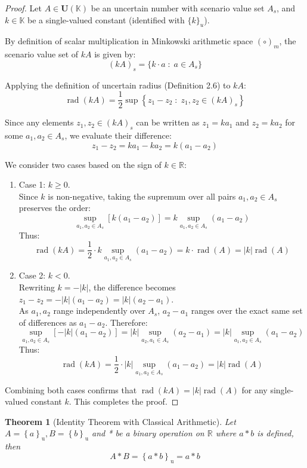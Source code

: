 \documentclass[a4paper,12pt, twoside]{memoir}
\newtheorem{theorem}{Theorem}[chapter]
\DeclareMathOperator{\rad}{rad}
\newcommand{\set}[1]{\left\{#1\right\}} %
\newcommand{\s}[1]{\set{#1}_\mathrm{u}} %
\newcommand{\tsbd}[1]{\mathbf{U}(\mathbb{#1})}
\begin{document}
\begin{proof}
	Let $A \in \tsbd{K}$ be an uncertain number with scenario value set $A_s$, and $k \in \mathbb{K}$ be a single-valued constant (identified with $\{k\}_u$).

	By definition of scalar multiplication in Minkowski arithmetic space $(\circ)_m$, the scenario value set of $k A$ is given by:
	\[
		(k A)_s = \{k \cdot a \;:\; a \in A_s\}
	\]

	Applying the definition of uncertain radius (Definition 2.6) to $k A$:
	\[
		\rad(k A) = \frac{1}{2} \sup \set{z_1 - z_2 \;:\; z_1, z_2 \in (k A)_s}
	\]

	Since any elements $z_1, z_2 \in (k A)_s$ can be written as $z_1 = k a_1$ and $z_2 = k a_2$ for some $a_1, a_2 \in A_s$, we evaluate their difference:
	\[
		z_1 - z_2 = k a_1 - k a_2 = k(a_1 - a_2)
	\]

	We consider two cases based on the sign of $k \in \mathbb{R}$:
	\begin{enumerate}[leftmargin=*]
		\item Case 1: $k \ge 0$. \\
		      Since $k$ is non-negative, taking the supremum over all pairs $a_1, a_2 \in A_s$ preserves the order:
		      \[
			      \sup_{a_1, a_2 \in A_s} [k(a_1 - a_2)] = k \sup_{a_1, a_2 \in A_s} (a_1 - a_2)
		      \]
		      Thus:
		      \[
			      \rad(k A) = \frac{1}{2} \cdot k \sup_{a_1, a_2 \in A_s} (a_1 - a_2) = k \cdot \rad(A) = |k| \rad(A)
		      \]

		\item Case 2: $k < 0$. \\
		      Rewriting $k = -|k|$, the difference becomes $z_1 - z_2 = -|k|(a_1 - a_2) = |k|(a_2 - a_1)$. \\
		      As $a_1, a_2$ range independently over $A_s$, $a_2 - a_1$ ranges over the exact same set of differences as $a_1 - a_2$. Therefore:
		      \[
			      \sup_{a_1, a_2 \in A_s} [-|k|(a_1 - a_2)] = |k| \sup_{a_2, a_1 \in A_s} (a_2 - a_1) = |k| \sup_{a_1, a_2 \in A_s} (a_1 - a_2)
		      \]
		      Thus:
		      \[
			      \rad(k A) = \frac{1}{2} \cdot |k| \sup_{a_1, a_2 \in A_s} (a_1 - a_2) = |k| \rad(A)
		      \]
	\end{enumerate}

	Combining both cases confirms that $\rad(k A) = |k| \rad(A)$ for any single-valued constant $k$. This completes the proof.
\end{proof}
\begin{theorem}[Identity Theorem with Classical Arithmetic]
	Let $A = \s{a} , B = \s{b}$ and * be a binary operation on $\mathbb{R}$ where $a*b$ is defined, then
	$$A * B = \s{a*b} = a*b$$
\end{theorem}
\end{document}
